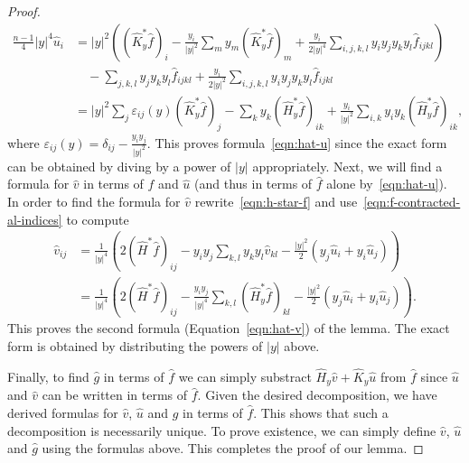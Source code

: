 \documentclass[10pt,a4paper]{amsart}
\newcommand{\abs}[1]{\lvert #1 \rvert}
\begin{document}
\begin{proof}
\begin{equation}
\begin{split}
\frac{n-1}{4}\abs{y}^4\widehat u_i
&=
\abs{y}^2
\left(
(\widehat{K}^*_y\widehat f)_i
-
\frac{y_i}{\abs{y}^2}\sum_m y_m(\widehat{K}^*_y\widehat f)_m
+
\frac{y_i}{2\abs{y}^4}
\sum_{i,j,k,l}
y_iy_jy_ky_l\widehat f_{ijkl}
\right)
\\
&\quad
-
\sum_{j,k,l}
y_jy_ky_l\widehat f_{ijkl}
+
\frac{y_i}{2\abs{y}^2}
\sum_{i,j,k,l}
y_iy_jy_ky_l\widehat f_{ijkl}
\\
&=
\abs{y}^2
\sum_j
\varepsilon_{ij}(y)
(\widehat{K}^*_y\widehat f)_j
-
\sum_k
y_k(\widehat{H}^*_y\widehat f)_{ik}
+
\frac{y_i}{\abs{y}^2}
\sum_{i,k}
y_iy_k
(\widehat{H}^*_y\widehat f)_{ik},
\end{split}
\end{equation}
where $ \varepsilon_{ij}(y)
=
\delta_{ij}
-\frac{y_iy_j}{\abs{y}^2}.$
This proves formula~\eqref{eqn:hat-u} since the exact form can be obtained by diving by a power of $\abs{y}$ appropriately. Next, we will find a formula for $\widehat v$ in terms of $\widehat f$ and $\widehat u$ (and thus in terms of $\widehat f$ alone by~\eqref{eqn:hat-u}). In order to find the formula for $\widehat v$ rewrite~\eqref{eqn:h-star-f} and use~\eqref{eqn:f-contracted-al-indices} to compute
\begin{equation}
\begin{split}
\widehat v_{ij}
&=
\frac{1}{\abs{y}^4}
\left(
2(\widehat{H}^*\widehat f)_{ij}
-
y_iy_j
\sum_{k,l}
y_ky_l
\widehat v_{kl}
-
\frac{\abs{y}^2}{2}(y_j\widehat u_i+y_i\widehat u_j)
\right)
\\&=
\frac{1}{\abs{y}^4}
\left(
2(\widehat{H}^*\widehat f)_{ij}
-
\frac{y_iy_j}{\abs{y}^4}
\sum_{k,l}
(\widehat{H}^*_y\widehat f)_{kl}
-
\frac{\abs{y}^2}{2}(y_j\widehat u_i+y_i\widehat u_j)
\right).
\end{split}
\end{equation}
This proves the second formula (Equation~\eqref{eqn:hat-v}) of the lemma. The exact form is obtained by distributing the powers of $\abs{y}$ above.

Finally, to find $\widehat g$ in terms of $\widehat f$ we can simply substract $\widehat{H}_y\widehat v + \widehat{K}_y\widehat u$ from $\widehat f$ since $\widehat u$ and $\widehat v$ can be written in terms of $\widehat f$. Given the desired decomposition, we have derived formulas for $\widehat v$, $\widehat u$ and $\widehat g$ in terms of $\widehat f$. This shows that such a decomposition is necessarily unique. To prove existence, we can simply define $\widehat v$, $\widehat u$ and $\widehat g$ using the formulas above. This completes the proof of our lemma.
\end{proof}
\end{document}
